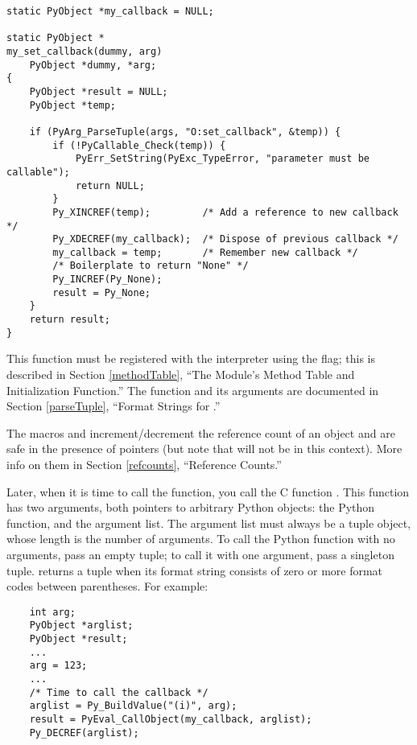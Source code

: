 \documentclass{manual}
\begin{document}
\begin{verbatim}
static PyObject *my_callback = NULL;

static PyObject *
my_set_callback(dummy, arg)
    PyObject *dummy, *arg;
{
    PyObject *result = NULL;
    PyObject *temp;

    if (PyArg_ParseTuple(args, "O:set_callback", &temp)) {
        if (!PyCallable_Check(temp)) {
            PyErr_SetString(PyExc_TypeError, "parameter must be callable");
            return NULL;
        }
        Py_XINCREF(temp);         /* Add a reference to new callback */
        Py_XDECREF(my_callback);  /* Dispose of previous callback */
        my_callback = temp;       /* Remember new callback */
        /* Boilerplate to return "None" */
        Py_INCREF(Py_None);
        result = Py_None;
    }
    return result;
}
\end{verbatim}

This function must be registered with the interpreter using the
 flag; this is described in Section
\ref{methodTable}, ``The Module's Method Table and Initialization
Function.''  The  function and its
arguments are documented in Section \ref{parseTuple}, ``Format Strings
for .''

The macros  and 
increment/decrement the reference count of an object and are safe in
the presence of \NULL{} pointers (but note that  will not be 
\NULL{} in this context).  More info on them in Section
\ref{refcounts}, ``Reference Counts.''

Later, when it is time to call the function, you call the C function
.  This function has two arguments, both
pointers to arbitrary Python objects: the Python function, and the
argument list.  The argument list must always be a tuple object, whose
length is the number of arguments.  To call the Python function with
no arguments, pass an empty tuple; to call it with one argument, pass
a singleton tuple.   returns a tuple when its
format string consists of zero or more format codes between
parentheses.  For example:

\begin{verbatim}
    int arg;
    PyObject *arglist;
    PyObject *result;
    ...
    arg = 123;
    ...
    /* Time to call the callback */
    arglist = Py_BuildValue("(i)", arg);
    result = PyEval_CallObject(my_callback, arglist);
    Py_DECREF(arglist);
\end{verbatim}
\end{document}
